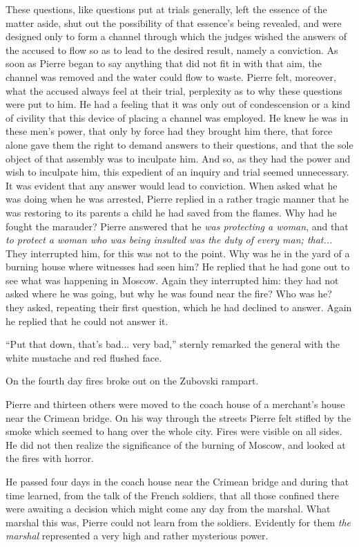 These questions, like questions put at trials generally, left the
essence of the matter aside, shut out the possibility of that
essence's being revealed, and were designed only to form a
channel through which the judges wished the answers of the
accused to flow so as to lead to the desired result, namely a
conviction. As soon as Pierre began to say anything that did not
fit in with that aim, the channel was removed and the water could
flow to waste. Pierre felt, moreover, what the accused always
feel at their trial, perplexity as to why these questions were
put to him. He had a feeling that it was only out of
condescension or a kind of civility that this device of placing a
channel was employed. He knew he was in these men's power, that
only by force had they brought him there, that force alone gave
them the right to demand answers to their questions, and that the
sole object of that assembly was to inculpate him. And so, as
they had the power and wish to inculpate him, this expedient of
an inquiry and trial seemed unnecessary. It was evident that any
answer would lead to conviction. When asked what he was doing
when he was arrested, Pierre replied in a rather tragic manner
that he was restoring to its parents a child he had saved from
the flames. Why had he fought the marauder? Pierre answered that
he \emph{was protecting a woman}, and that \emph{to protect a
woman who was being insulted was the duty of every man; that...}
They interrupted him, for this was not to the point. Why was he
in the yard of a burning house where witnesses had seen him? He
replied that he had gone out to see what was happening in
Moscow. Again they interrupted him: they had not asked where he
was going, but why he was found near the fire? Who was he? they
asked, repeating their first question, which he had declined to
answer.  Again he replied that he could not answer it.

``Put that down, that's bad... very bad,'' sternly remarked the
general with the white mustache and red flushed face.

On the fourth day fires broke out on the Zubovski rampart.

Pierre and thirteen others were moved to the coach house of a
merchant's house near the Crimean bridge. On his way through the
streets Pierre felt stifled by the smoke which seemed to hang
over the whole city.  Fires were visible on all sides. He did not
then realize the significance of the burning of Moscow, and
looked at the fires with horror.

He passed four days in the coach house near the Crimean bridge
and during that time learned, from the talk of the French
soldiers, that all those confined there were awaiting a decision
which might come any day from the marshal. What marshal this was,
Pierre could not learn from the soldiers. Evidently for them
\emph{the marshal} represented a very high and rather mysterious
power.

